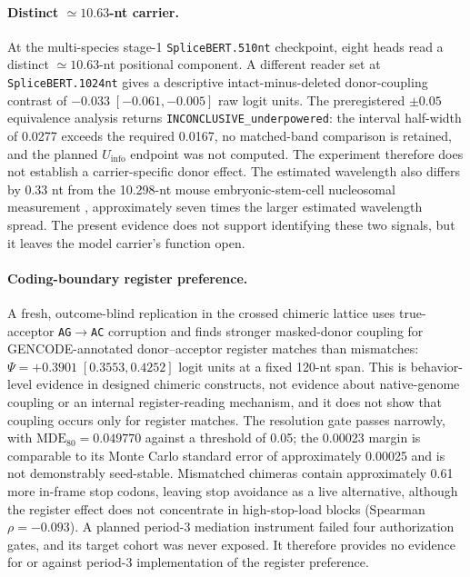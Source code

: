 \documentclass{article}
\newcommand{\Uinfo}{\ensuremath{U_{\mathrm{info}}}}
\begin{document}
\paragraph{Distinct \(\simeq10.63\)-nt carrier.}
At the multi-species stage-1 \texttt{SpliceBERT.510nt} checkpoint, eight heads read a distinct \(\simeq10.63\)-nt positional component. A different reader set at \texttt{SpliceBERT.1024nt} gives a descriptive intact-minus-deleted donor-coupling contrast of \(-0.033\;[-0.061,-0.005]\) raw logit units. The preregistered \(\pm0.05\) equivalence analysis returns \texttt{INCONCLUSIVE\_underpowered}: the interval half-width of 0.0277 exceeds the required 0.0167, no matched-band comparison is retained, and the planned \Uinfo{} endpoint was not computed. The experiment therefore does not establish a carrier-specific donor effect. The estimated wavelength also differs by 0.33 nt from the 10.298-nt mouse embryonic-stem-cell nucleosomal measurement \citep{voong2016nucleosome}, approximately seven times the larger estimated wavelength spread. The present evidence does not support identifying these two signals, but it leaves the model carrier's function open.

\paragraph{Coding-boundary register preference.}
A fresh, outcome-blind replication in the crossed chimeric lattice uses true-acceptor \texttt{AG}\(\rightarrow\)\texttt{AC} corruption and finds stronger masked-donor coupling for GENCODE-annotated donor--acceptor register matches than mismatches: \(\Psi=+0.3901\;[0.3553,0.4252]\) logit units at a fixed 120-nt span. This is behavior-level evidence in designed chimeric constructs, not evidence about native-genome coupling or an internal register-reading mechanism, and it does not show that coupling occurs only for register matches. The resolution gate passes narrowly, with \(\mathrm{MDE}_{80}=0.049770\) against a threshold of 0.05; the 0.00023 margin is comparable to its Monte Carlo standard error of approximately 0.00025 and is not demonstrably seed-stable. Mismatched chimeras contain approximately 0.61 more in-frame stop codons, leaving stop avoidance as a live alternative, although the register effect does not concentrate in high-stop-load blocks (Spearman \(\rho=-0.093\)). A planned period-3 mediation instrument failed four authorization gates, and its target cohort was never exposed. It therefore provides no evidence for or against period-3 implementation of the register preference.
\end{document}
